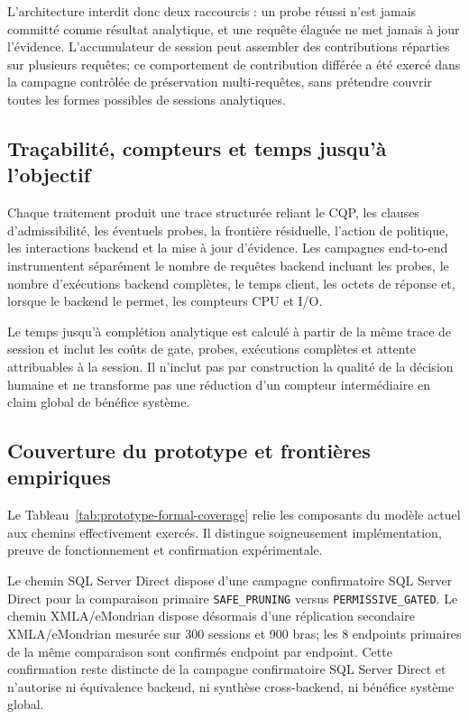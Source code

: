 \documentclass[journal]{IEEEtran}
\begin{document}
L'architecture interdit donc deux raccourcis : un probe réussi n'est jamais committé comme résultat analytique, et une requête élaguée ne met jamais à jour l'évidence. L'accumulateur de session peut assembler des contributions réparties sur plusieurs requêtes; ce comportement de contribution différée a été exercé dans la campagne contrôlée de préservation multi-requêtes, sans prétendre couvrir toutes les formes possibles de sessions analytiques.

\subsection{Traçabilité, compteurs et temps jusqu'à l'objectif}

Chaque traitement produit une trace structurée reliant le CQP, les clauses d'admissibilité, les éventuels probes, la frontière résiduelle, l'action de politique, les interactions backend et la mise à jour d'évidence. Les campagnes end-to-end instrumentent séparément le nombre de requêtes backend incluant les probes, le nombre d'exécutions backend complètes, le temps client, les octets de réponse et, lorsque le backend le permet, les compteurs CPU et I/O.

Le temps jusqu'à complétion analytique est calculé à partir de la même trace de session et inclut les coûts de gate, probes, exécutions complètes et attente attribuables à la session. Il n'inclut pas par construction la qualité de la décision humaine et ne transforme pas une réduction d'un compteur intermédiaire en claim global de bénéfice système.

\subsection{Couverture du prototype et frontières empiriques}

Le Tableau~\ref{tab:prototype-formal-coverage} relie les composants du modèle actuel aux chemins effectivement exercés. Il distingue soigneusement implémentation, preuve de fonctionnement et confirmation expérimentale.



Le chemin SQL Server Direct dispose d'une campagne confirmatoire SQL Server Direct pour la comparaison primaire \texttt{SAFE\_PRUNING} versus \texttt{PERMISSIVE\_GATED}. Le chemin XMLA/eMondrian dispose désormais d'une réplication secondaire XMLA/eMondrian mesurée sur 300 sessions et 900 bras; les 8 endpoints primaires de la même comparaison sont confirmés endpoint par endpoint. Cette confirmation reste distincte de la campagne confirmatoire SQL Server Direct et n'autorise ni équivalence backend, ni synthèse cross-backend, ni bénéfice système global.
\end{document}
